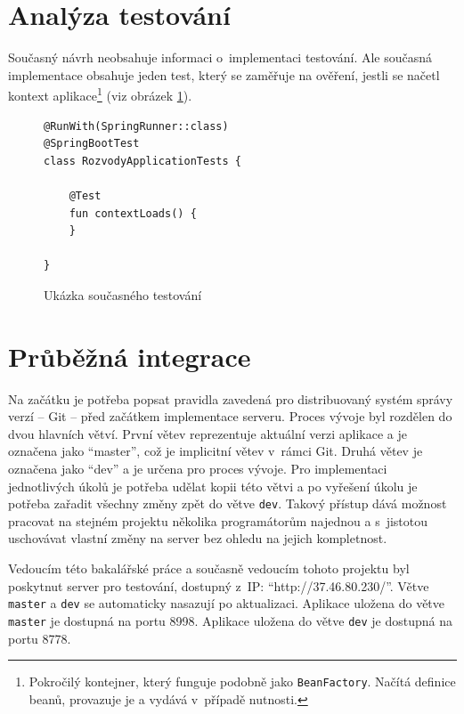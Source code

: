 \section{Analýza testování}\label{analyza:testovani}
    Současný návrh neobsahuje informaci o~implementaci testování. Ale současná implementace obsahuje jeden test, který se zaměřuje na ověření, jestli se načetl {kontext aplikace}\footnote{Pokročilý kontejner, který funguje podobně jako \texttt{BeanFactory}. Načítá definice beanů, provazuje je a vydává v~případě nutnosti.} (viz obrázek \ref{code:test-context-loads1}).
    \begin{figure}
    \begin{verbatim}
@RunWith(SpringRunner::class)
@SpringBootTest
class RozvodyApplicationTests {

    @Test
    fun contextLoads() {
    }

}
        \end{verbatim}
        \caption{Ukázka současného testování} 
        \label{code:test-context-loads1}
        \end{figure}
        
\section{Průběžná integrace}\label{analyza:ci}
    Na začátku je potřeba popsat pravidla zavedená pro distribuovaný systém správy verzí -- Git -- před začátkem implementace serveru. Proces vývoje byl rozdělen do dvou hlavních větví. První větev reprezentuje aktuální verzi aplikace a je označena jako \enquote{master}, což je implicitní větev v~rámci Git. Druhá větev je označena jako \enquote{dev} a je určena pro proces vývoje. Pro implementaci jednotlivých úkolů je potřeba udělat kopii této větvi a po vyřešení úkolu je potřeba zařadit všechny změny zpět do větve \verb|dev|. Takový přístup dává možnost pracovat na stejném projektu několika programátorům najednou a s~jistotou uschovávat vlastní změny na server bez ohledu na jejich kompletnost.
    
    Vedoucím této bakalářské práce a současně vedoucím tohoto projektu byl poskytnut server pro testování, dostupný z~IP: \enquote{http://37.46.80.230/}. Větve \verb|master| a \verb|dev| se automaticky nasazují po aktualizaci. Aplikace uložena do větve \verb|master| je dostupná na portu 8998. Aplikace uložena do větve \verb|dev| je dostupná na portu 8778.